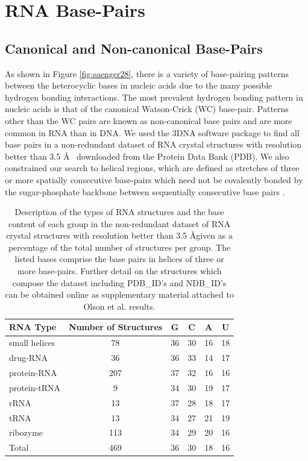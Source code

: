 \chapter{RNA Base-Pairs}
\label{basepairs} 

\section{Canonical and Non-canonical Base-Pairs}
As  shown  in  Figure  \ref{fig:saenger28},  there  is  a  variety  of
base-pairing patterns between the  heterocyclic bases in nucleic acids
due  to the  many possible  hydrogen bonding  interactions.   The most
prevalent hydrogen  bonding pattern  in nucleic acids  is that  of the
canonical  Watson-Crick (WC)  base-pair.  Patterns  other than  the WC
pairs are known as non-canonical base pairs and are more common in RNA
than in DNA.  We used  the 3DNA \cite{lu2003} software package to find
all base  pairs in a  non-redundant dataset of RNA  crystal structures
with resolution better than 3.5  \AA~ downloaded from the Protein Data
Bank (PDB).  We also constrained  our search to helical regions, which
are  defined  as stretches  of  three  or  more spatially  consecutive
base-pairs which need not  be covalently bonded by the sugar-phosphate
backbone between sequentially consecutive base pairs \cite{olson2009}.

\begin{table}[htbp]
\begin{center}
\begin{tabular}{|l|c|r|r|r|r|}
\hline
RNA Type & \multicolumn{1}{p{2cm}|}{Number of Structures} & \multicolumn{1}{c|}{G} &
\multicolumn{1}{c|}{C} & \multicolumn{1}{c|}{A} &
\multicolumn{1}{c|}{U} \\ \hline 
small helices & 78 & 36 & 30 & 16 & 18 \\ \hline
drug-RNA & 36 & 36 & 33 & 14 & 17 \\ \hline
protein-RNA & 207 & 37 & 32 & 16 & 16 \\ \hline
protein-tRNA & 9 & 34 & 30 & 19 & 17 \\ \hline
rRNA & 13 & 37 & 28 & 18 & 17 \\ \hline
tRNA & 13 & 34 & 27 & 21 & 19 \\ \hline
ribozyme & 113 & 34 & 29 & 20 & 16 \\ \hline
Total & 469 & \multicolumn{1}{c|}{36} & \multicolumn{1}{c|}{30} & \multicolumn{1}{c|}{18} & \multicolumn{1}{c|}{16} \\ \hline
\end{tabular}
\caption{Description  of the  types  of RNA  structures  and the  base
  content of  each group in  the non-redundant dataset of  RNA crystal
  structures with resolution better than 3.5 \AA given as a percentage
  of  the total  number of  structures  per group.   The listed  bases
  comprise  the base  pairs in  helices of  three or  more base-pairs.
  Further detail on the structures which compose the dataset including
  PDB\_ID's  and NDB\_ID's  can  be obtained  online as  supplementary
  material attached to Olson et al. \cite{olson2009} results.}
\label{tab:dbase}
\end{center}
\end{table}

